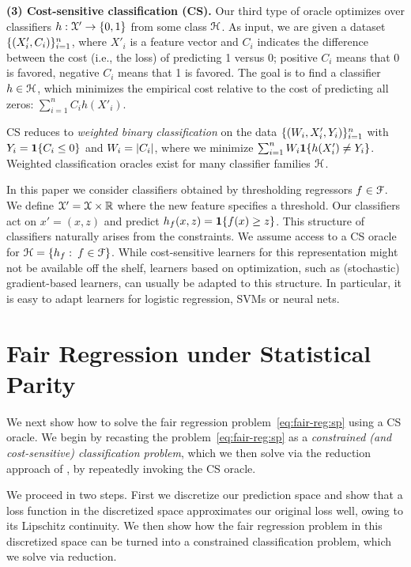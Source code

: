 \documentclass{article}
\begin{document}
\textbf{(3) Cost-sensitive classification (CS).}
Our third type of oracle optimizes over classifiers $h:\mathcal{X}'\to\{0,1\}$ from some class $\mathcal{H}$. As input, we are given a dataset $\{(X'_i,C_i)\}_{i=1}^n$, where $X'_i$ is a feature vector and $C_i$ indicates the difference between the cost (i.e., the loss) of predicting 1 versus 0; positive $C_i$ means that 0 is favored, negative $C_i$ means that 1 is favored. The goal is to find a classifier $h\in\mathcal{H}$, which minimizes the empirical cost relative to the cost of predicting all zeros: $\sum_{i=1}^n C_i h(X'_i)$.

CS reduces to \emph{weighted binary classification} on the data
$\{(W_i,X'_i,Y_i)\}_{i=1}^n$ with $Y_i=\mathbf{1}\{C_i\le 0\}$ and $W_i=\left\lvert C_i\right\rvert$, where we minimize
$\sum_{i=1}^n W_i\mathbf{1}\{h(X'_i)\ne Y_i\}$. Weighted classification oracles exist for many classifier families $\mathcal{H}$.

In this paper we consider classifiers obtained by thresholding regressors $f \in \mathcal{F}$. We define $\mathcal{X}' = \mathcal{X}\times \mathbb{R}$ where the new feature specifies a threshold. Our classifiers act on $x' = (x,z)$ and predict $h_f(x,z) = \mathbf{1}\{f(x) \geq z\}$. This structure of classifiers naturally arises from the \sp constraints. We assume access to a CS oracle for $\mathcal{H}=\{h_f:\:f\in\mathcal{F}\}$. While cost-sensitive learners for this representation might not be available off the shelf, learners based on optimization, such as (stochastic) gradient-based learners, can usually be adapted to this structure. In particular, it is easy to adapt learners for logistic regression, SVMs or neural nets.

\section{Fair Regression under Statistical Parity}

We next show how to solve the fair regression problem~\eqref{eq:fair-reg:sp} using
a CS oracle.
We begin by recasting the problem~\eqref{eq:fair-reg:sp} as a \emph{constrained (and cost-sensitive) classification problem},
which we then solve via the reduction approach of \citet{agarwal2018reductions}, by repeatedly invoking the CS oracle.

We proceed in two steps. First we discretize our prediction space and show that a loss function in the discretized space approximates our original loss well, owing to its Lipschitz continuity. We then show how the fair regression problem in this discretized space can be turned into a constrained classification problem, which we solve via reduction.
\end{document}
